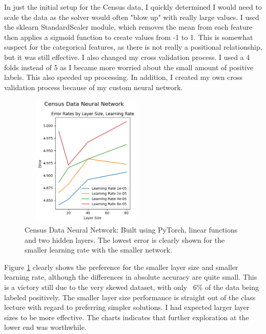 \documentclass[letterpaper]{article} %
\begin{document}
In just the initial setup for the Census data, I quickly determined I would need to scale the data as the solver would often "blow up" with really large values.  I used the sklearn StandardScaler module, which removes the mean from each feature then applies a sigmoid function to create values from -1 to 1.  This is somewhat suspect for the categorical features, as there is not really a positional relationship, but it was still effective.  I also changed my cross validation process.  I used a 4 folds instead of 5 as I became more worried about the small amount of positive labels.  This also speeded up processing.  In addition, I created my own cross validation process because of my custom neural network. 

\begin{figure}[htb]
\centering
\includegraphics[width=2.5in, height=2.5in]{figures/Census_Data_Neural_Network_Error_Rates_by_Layer_Size__Learning_Rate_census.png}
\caption{Census Data Neural Network:  Built using PyTorch, linear functions and two hidden layers.  The lowest error is clearly shown for the smaller learning rate with the smaller network.   }
\label{fig:census_neural_network_start}
\end{figure}

Figure \ref{fig:census_neural_network_start} clearly shows the preference for the smaller layer size and smaller learning rate, although the differences in absolute accuracy are quite small.  This is a victory still due to the very skewed dataset, with only ~6\% of the data being labeled positively.  The smaller layer size performance is straight out of the class lecture with regard to preferring simpler solutions.  I had expected larger layer sizes to be more effective.  The charts indicates that further exploration at the lower end was worthwhile.
\end{document}
